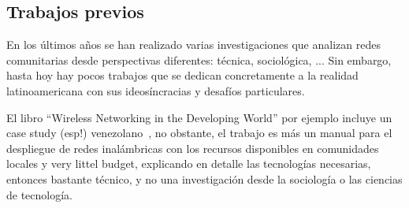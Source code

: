 \begin{comment}
\noindent \emph{Welche Ziele werden mit der Arbeit verfolgt? Welche zentralen Fragen lassen sich daraus ableiten?}
	Die Ziele sollten so spezifisch wie möglich sein. Das hilft Ihnen im Verlauf der Umsetzung zu prüfen, ob Sie Ihre Ziele erreichen konnten. Bitte achten Sie darauf, dass die gesetzten Ziele realistisch sind und das Sie in der Lage sind, das erfolgreiche Erreichen dieser Ziele im Bereich Evaluation zu prüfen.
  \end{comment}


\begin{comment}
* análisis: ciberoptimismo al nivel físico de las redes/al nivel social de la organización de los grupos
\end{comment}


\begin{comment}
La noción ``Redes'' tiene sentidos multiples:
* redes sociales, en el sentido de grupos de gente y las relaciones entre ellxs
* redes sociales, en el sentido de herramientas y aplicaciones digitales que permiten que la gente se relacione de cierta manera en el ámbito digital
* redes en el sentido de la ANT: un modelo abstracto para observar interacción y redistribución de relaciones/recursos/poder; permiten hacer zoom in and out
* redes como infraestructura física: cables, computadoras, antenas, routers <-- un requisito para las demás capas/la mayoría de los sentidos
** también redes sociales de gente (en un sentido amplio: gente organizada/estructurada de cierta manera) que decide/construye y mantiene la infraestructura física.
--> potencial conflictivo enorme: lxs que/quienes controlan la infraestructura, controlan la comunicación y tienen un poder enorme
\end{comment}

\subsection{Trabajos previos}

En los últimos años se han realizado varias investigaciones que analizan redes comunitarias desde perspectivas diferentes: técnica, sociológica, ...
Sin embargo, hasta hoy hay pocos trabajos que se dedican concretamente a la realidad latinoamericana con sus ideosíncracias y desafíos particulares.

El libro ``Wireless Networking in the Developing World'' por ejemplo incluye un case study (esp!) venezolano~\autocite[437-452]{WNDW2013}, no obstante, el trabajo es más un manual para el despliegue de redes inalámbricas con los recursos disponibles en comunidades locales y very littel budget, explicando en detalle las tecnologías necesarias, entonces bastante técnico, y no una investigación desde la sociología o las ciencias de tecnología.

